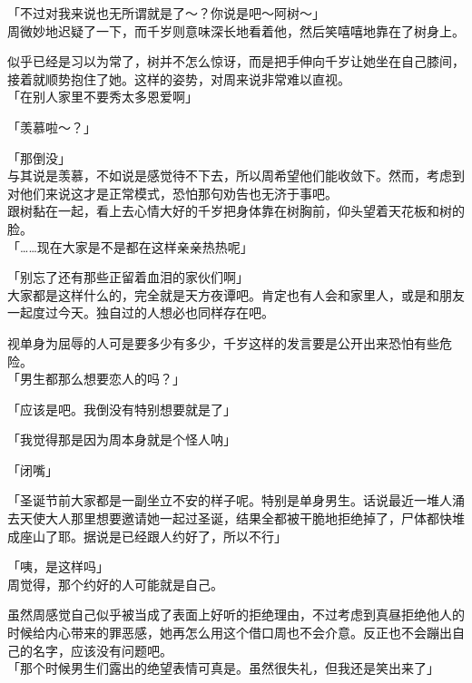 「不过对我来说也无所谓就是了～？你说是吧～阿树～」\\

周微妙地迟疑了一下，而千岁则意味深长地看着他，然后笑嘻嘻地靠在了树身上。

似乎已经是习以为常了，树并不怎么惊讶，而是把手伸向千岁让她坐在自己膝间，接着就顺势抱住了她。这样的姿势，对周来说非常难以直视。\\

「在别人家里不要秀太多恩爱啊」

「羡慕啦～？」

「那倒没」\\

与其说是羡慕，不如说是感觉待不下去，所以周希望他们能收敛下。然而，考虑到对他们来说这才是正常模式，恐怕那句劝告也无济于事吧。\\

跟树黏在一起，看上去心情大好的千岁把身体靠在树胸前，仰头望着天花板和树的脸。\\

「……现在大家是不是都在这样亲亲热热呢」

「别忘了还有那些正留着血泪的家伙们啊」\\

大家都是这样什么的，完全就是天方夜谭吧。肯定也有人会和家里人，或是和朋友一起度过今天。独自过的人想必也同样存在吧。

视单身为屈辱的人可是要多少有多少，千岁这样的发言要是公开出来恐怕有些危险。\\

「男生都那么想要恋人的吗？」

「应该是吧。我倒没有特别想要就是了」

「我觉得那是因为周本身就是个怪人呐」

「闭嘴」

「圣诞节前大家都是一副坐立不安的样子呢。特别是单身男生。话说最近一堆人涌去天使大人那里想要邀请她一起过圣诞，结果全都被干脆地拒绝掉了，尸体都快堆成座山了耶。据说是已经跟人约好了，所以不行」

「咦，是这样吗」\\%

周觉得，那个约好的人可能就是自己。

虽然周感觉自己似乎被当成了表面上好听的拒绝理由，不过考虑到真昼拒绝他人的时候给内心带来的罪恶感，她再怎么用这个借口周也不会介意。反正也不会蹦出自己的名字，应该没有问题吧。\\%

「那个时候男生们露出的绝望表情可真是。虽然很失礼，但我还是笑出来了」

